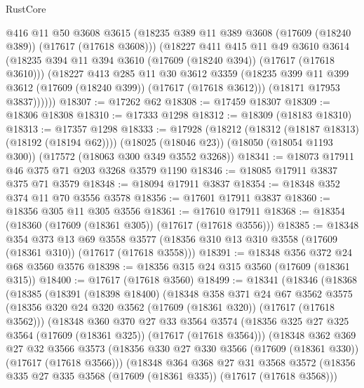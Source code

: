 \begin{lexlean}{RustCore}
\begin{coremodule}
          @416
          @11
          @50
          @3608
          @3615
          (@18235 @389 @11 @389 @3608 (@17609 (@18240 @389)) (@17617 (@17618 @3608)))
          (@18227
            @411
            @415
            @11
            @49
            @3610
            @3614
            (@18235 @394 @11 @394 @3610 (@17609 (@18240 @394)) (@17617 (@17618 @3610)))
            (@18227
              @413
              @285
              @11
              @30
              @3612
              @3359
              (@18235 @399 @11 @399 @3612 (@17609 (@18240 @399)) (@17617 (@17618 @3612)))
              (@18171 @17953 @3837))))))
@18307 := @17262 @62
@18308 := @17459 @18307
@18309 := @18306 @18308
@18310 := @17333 @1298
@18312 := @18309 (@18183 @18310)
@18313 := @17357 @1298
@18333 := @17928
    (@18212 (@18312 (@18187 @18313) (@18192 (@18194 @62))))
    (@18025 (@18046 @23))
    (@18050 (@18054 @1193 @300))
    (@17572 (@18063 @300 @349 @3552 @3268))
@18341 := @18073 @17911 @46 @375 @71 @203 @3268 @3579 @1190
@18346 := @18085 @17911 @3837 @375 @71 @3579
@18348 := @18094 @17911 @3837
@18354 := @18348 @352 @374 @11 @70 @3556 @3578
@18356 := @17601 @17911 @3837
@18360 := @18356 @305 @11 @305 @3556
@18361 := @17610 @17911
@18368 := @18354 (@18360 (@17609 (@18361 @305)) (@17617 (@17618 @3556)))
@18385 := @18348
    @354
    @373
    @13
    @69
    @3558
    @3577
    (@18356 @310 @13 @310 @3558 (@17609 (@18361 @310)) (@17617 (@17618 @3558)))
@18391 := @18348 @356 @372 @24 @68 @3560 @3576
@18398 := @18356 @315 @24 @315 @3560 (@17609 (@18361 @315))
@18400 := @17617 (@17618 @3560)
@18499 := @18341
    (@18346
      (@18368
        (@18385
          (@18391
            (@18398 @18400)
            (@18348
              @358
              @371
              @24
              @67
              @3562
              @3575
              (@18356 @320 @24 @320 @3562 (@17609 (@18361 @320)) (@17617 (@17618 @3562)))
              (@18348
                @360
                @370
                @27
                @33
                @3564
                @3574
                (@18356 @325 @27 @325 @3564 (@17609 (@18361 @325)) (@17617 (@17618 @3564)))
                (@18348
                  @362
                  @369
                  @27
                  @32
                  @3566
                  @3573
                  (@18356 @330 @27 @330 @3566 (@17609 (@18361 @330)) (@17617 (@17618 @3566)))
                  (@18348
                    @364
                    @368
                    @27
                    @31
                    @3568
                    @3572
                    (@18356 @335 @27 @335 @3568 (@17609 (@18361 @335)) (@17617 (@17618 @3568)))

\end{coremodule}
\end{lexlean}
